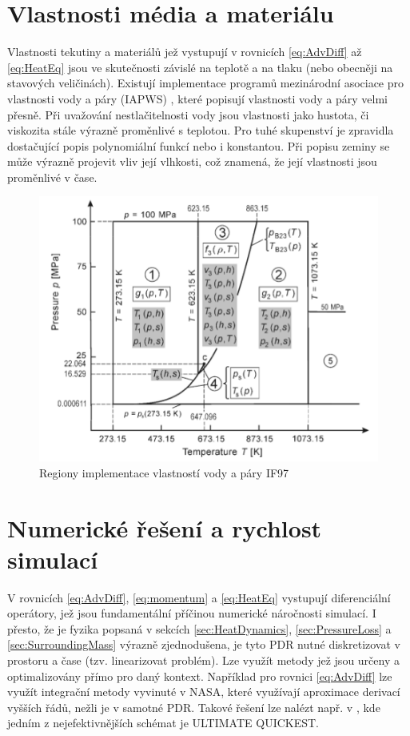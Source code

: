 \section{Vlastnosti média a materiálu}
Vlastnosti tekutiny a materiálů jež vystupují v rovnicích \ref{eq:AdvDiff} až
\ref{eq:HeatEq} jsou ve skutečnosti závislé na teplotě a na tlaku (nebo
obecněji na stavových veličinách). Existují implementace programů mezinárodní
asociace pro vlastnosti vody a páry (IAPWS) \cite{IAPWS2007}, které popisují
vlastnosti vody a páry velmi přesně. Při uvažování nestlačitelnosti vody jsou
vlastnosti jako hustota, či viskozita stále výrazně proměnlivé s teplotou. Pro
tuhé skupenství je zpravidla dostačující popis polynomiální funkcí nebo i
konstantou. Při popisu zeminy se může výrazně projevit vliv její vlhkosti, což
znamená, že její vlastnosti jsou proměnlivé v čase.

\begin{figure}[h] \centering \capstart
  \includegraphics[scale=0.4]{figures/IF97}
  \caption{Regiony implementace vlastností vody a páry IF97 \cite{IAPWS2007}}
  \label{fig:IF97}
\end{figure}

\section{Numerické řešení a rychlost simulací}
\label{sec:NumSpeed}
V rovnicích \ref{eq:AdvDiff}, \ref{eq:momentum} a \ref{eq:HeatEq} vystupují
diferenciální operátory, jež jsou fundamentální příčinou numerické náročnosti
simulací. I přesto, že je fyzika popsaná v sekcích \ref{sec:HeatDynamics},
\ref{sec:PressureLoss} a \ref{sec:SurroundingMass} výrazně zjednodušena, je
tyto PDR nutné diskretizovat v prostoru a čase (tzv. linearizovat problém). Lze
využít metody jež jsou určeny a optimalizovány přímo pro daný kontext.
Například pro rovnici \ref{eq:AdvDiff} lze využít integrační metody vyvinuté v
NASA, které využívají aproximace derivací vyšších řádů, nežli je v samotné PDR.
Takové řešení lze nalézt např. v \cite{leonard1988}, kde jedním z
nejefektivnějších schémat je ULTIMATE QUICKEST.

